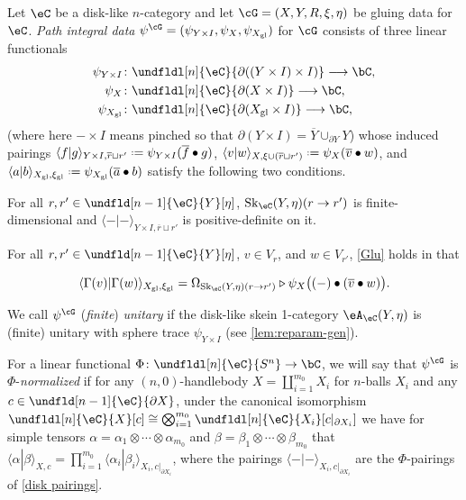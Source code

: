 \documentclass[12pt,reqno]{amsart}
\newcounter{alpha}\renewcommand\thealpha{\upshape\Alph{alpha}}
\newcommand{\glu}{\mathrm{gl}}
\newcommand{\Sk}{\mathrm{Sk}}
\newcommand{\psn}{\Phi}
\newcommand{\A}{\eA}
\newcommand{\C}{\eC}
\newcommand{\blt}{\bullet}
\newcommand{\fcj}[1]{\overline{#1}}
\newcommand{\orev}{\overline}
\newcommand{\bkt}[2]{\langle #1|#2 \rangle}
\newcommand{\defn}[1]{\emph{#1}}
\renewcommand{\amalg}{\sqcup}
\DeclareRobustCommand{\coloneq}{\mathrel{\vcenter{\baselineskip0.5ex\lineskiplimit0pt\hbox{\scriptsize{\upshape.}}\hbox{\scriptsize{\upshape.}}}}=}
\begin{document}
\begin{definition}
\label{def:path-integral-data}
Let $\C$ be a disk-like $n$-category and let $\cG=(X,Y,R,\xi,\eta)$ be gluing data for $\C$. \defn{Path integral data} $\psi^\cG=(\psi_{Y\times I},\psi_X,\psi_{X_\glu})$ for $\cG$ consists of three linear functionals
\begin{align*}
\label{eq:pidata}
  \psi_{Y\times I}\colon&\undfldl[n]{\C}{\partial((Y\times I)\times I)}\longrightarrow\bC,
  \\
  \psi_X\colon&\undfldl[n]{\C}{\partial(X\times I)}\longrightarrow\bC,
  \\
  \psi_{X_\glu}\colon&\undfldl[n]{\C}{\partial(X_\glu\times I)}\longrightarrow\bC,
\end{align*}
(where here $-\times I$ means pinched so that $\partial(Y\times I)=\orev{Y}\cup_{\partial Y} Y$) whose induced pairings $\bkt fg_{Y\times I,\fcj r\amalg r'}\coloneq\psi_{Y\times I}(\fcj f\blt g)$, $\bkt vw_{X,\xi\cup(\fcj r\amalg r')}\coloneq\psi_X(\fcj v\blt w)$, and $\bkt ab_{X_\glu,\xi_\glu}\coloneq\psi_{X_{\glu}}(\fcj a\blt b)$ satisfy the following two conditions.
\begin{lst}[font=\upshape,leftmargin=0.6375in]
  \item[($\psi^\cG$Pos)]\label{ZP}
  For all $r,r'\in\undfld[n-1]{\C}{Y}[\eta]$, $\Sk_\C(Y,\eta)(r\to r')$ is finite-dimensional and $\bkt--_{Y\times I,\fcj r\amalg r'}$ is positive-definite on it.
  \item[($\psi^\cG$Glu)]\label{ZG}
  For all $r,r'\in\undfld[n-1]{\C}{Y}[\eta]$, $v\in V_r$, and $w\in V_{r'}$, \ref{Glu} holds in that
\end{lst}
\begin{equation}
\label{eq:pi-glu}
\bkt{\Gamma(v)}{\Gamma(w)}_{X_\glu,\xi_\glu}
=
\Omega_{\Sk_\C(Y,\eta)(r\to r')}\triangleright\psi_X\big((-)\blt(\fcj v\blt w)\big).
\end{equation}

We call $\psi^\cG$ (\defn{finite}) \defn{unitary} if the disk-like skein 1-category $\A_\C(Y,\eta)$ is (finite) unitary with sphere trace $\psi_{Y\times I}$ (see \cref{lem:reparam-gen}). 

For a linear functional $\psn\colon\undfldl[n]{\C}{S^n}\to\bC$, we will say that $\psi^\cG$ is $\psn$-\defn{normalized} if for any $(n,0)$-handlebody $X=\coprod_{i=1}^{m_0}X_i$ for $n$-balls $X_i$ and any $c\in\undfld[n-1]{\C}{\partial X}$, under the canonical isomorphism $\undfldl[n]{\C}{X}[c]\cong\bigotimes_{i=1}^{m_0}\undfldl[n]{\C}{X_i}[c|_{\partial X_i}]$ we have for simple tensors $\alpha=\alpha_1\otimes\cdots\otimes\alpha_{m_0}$ and $\beta=\beta_1\otimes\cdots\otimes\beta_{m_0}$ that $\bkt\alpha\beta_{X,c}=\prod_{i=1}^{m_0}\bkt{\alpha_i}{\beta_i}_{X_i,c|_{\partial X_i}}$, where the pairings $\bkt--_{X_i,c|_{\partial X_i}}$ are the $\psn$-pairings of \eqref{disk pairings}.
\end{definition}
\end{document}
